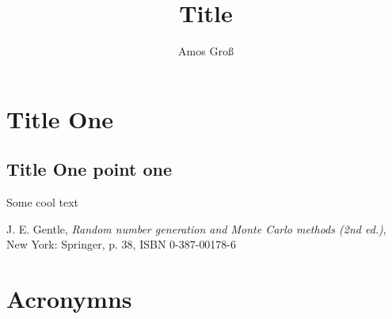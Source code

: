 \documentclass[a4,10pt]{article}
\begin{document}
\title{Title}

\author{Amos Groß }

\section{Title One}

\subsection{Title One point one} 
Some cool text

\begin{thebibliography}{99} %

 J. E. Gentle, \textit{Random number generation and Monte Carlo methods (2nd ed.)}, New York: Springer, p. 38, ISBN 0-387-00178-6

\end{thebibliography}

\section*{Acronymns}
\begin{acronym}[XXXXXXX]
\end{acronym}
\end{document}
